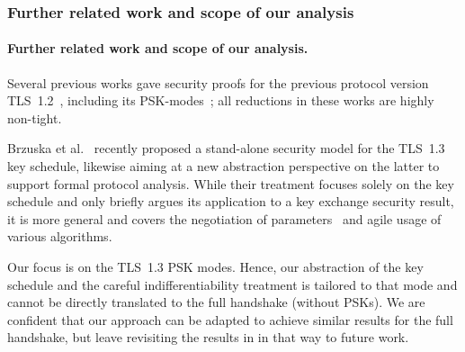 \iffull
\subsubsection*{Further related work and scope of our analysis}
\else
\paragraph{Further related work and scope of our analysis.}
\fi

Several previous works gave security proofs for the previous protocol version TLS~1.2~\cite{C:JKSS12,C:KraPatWee13,CCS:GieKohSte13,EPRINT:KraPatWee13,PKC:LSYKS14,C:BFKPSZ14},
including its PSK-modes~\cite{PKC:LSYKS14}; all reductions in these works are highly non-tight.

Brzuska et al.~\cite{EPRINT:BDEFKK21} recently proposed a stand-alone security model for the TLS~1.3 key schedule, likewise aiming at a new abstraction perspective on the latter to support formal protocol analysis.
While their treatment focuses solely on the key schedule and only briefly argues its application to a key exchange security result, it is more general and covers the negotiation of parameters~\cite{ACISP:DowSte15,SP:BBFGKZ16} and agile usage of various algorithms.

Our focus is on the TLS~1.3 PSK modes.
Hence, our abstraction of the key schedule and the careful indifferentiability treatment is tailored to that mode and cannot be directly translated to the full handshake (without PSKs).
We are confident that our approach can be adapted to achieve similar results for the full handshake, but leave revisiting the results in \cite{JC:DieJag21,ACNS:DavGun21} in that way to future work.

